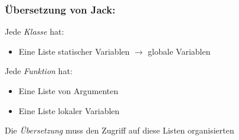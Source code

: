 \documentclass[12pt]{report}
\begin{document}
\begin{figure}[H]
  \begin{minipage}[t]{0.45\textwidth}
    \subsubsection{Übersetzung von Jack:}
    
    Jede \textit{Klasse} hat:
    
    \begin{itemize}
      \item Eine Liste statischer Variablen
            \subitem $\rightarrow$ globale Variablen
    \end{itemize}
    
    Jede \textit{Funktion} hat:
    
    \begin{itemize}
      \item Eine Liste von Argumenten
      \item Eine Liste lokaler Variablen
    \end{itemize}
    
    Die \textit{Übersetzung} muss den Zugriff auf diese Listen organisierten
    

\end{minipage}
\end{figure}
\end{document}
